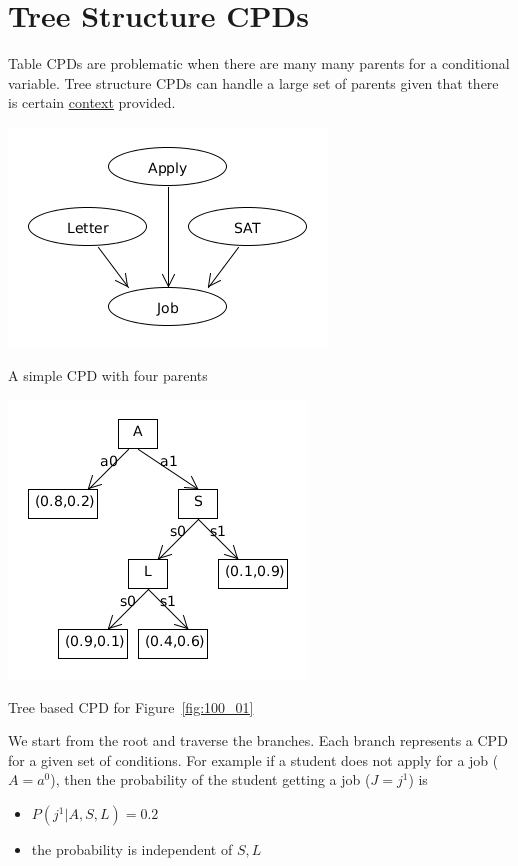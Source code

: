 \section{Tree Structure CPDs}\label{sec:treeCPD}
Table CPDs are problematic when there are many many parents for a conditional variable.
Tree structure CPDs can handle a large set of parents given that there is certain \underline{context} provided.
\begin{marginfigure}
\includegraphics{images/100_01}
\caption{A simple CPD with four parents}
\label{fig:100_01}
\end{marginfigure}

\begin{marginfigure}
\includegraphics{images/100_02}
\caption{Tree based CPD for Figure~\ref{fig:100_01}}
\label{fig:100_02}
\end{marginfigure}


We start from the root and traverse the branches.  Each branch represents a CPD for a given set of conditions.  For example if a student does not apply for a job ($A=a^0$), then the probability of the student getting a job ($J=j^1$) is
\begin{itemize}
\item $P(j^1 | 	A,S,L)=0.2$
\item the probability is independent of $S,L$
\end{itemize}


